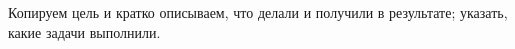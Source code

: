 \Conclusion

Копируем цель и кратко описываем, что делали и получили в результате; указать, какие задачи выполнили.
